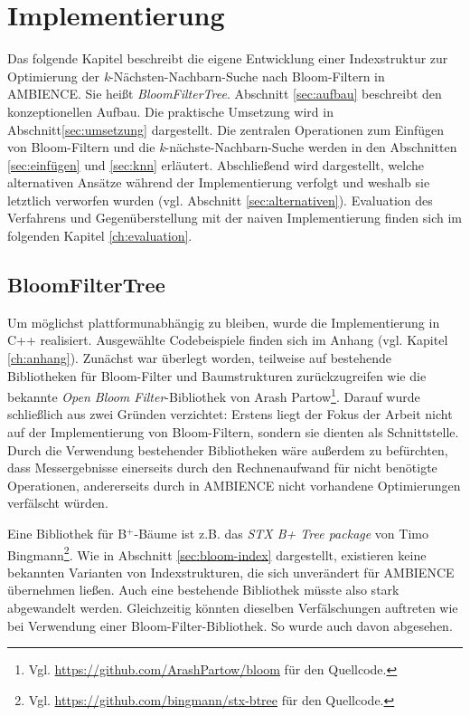 \chapter{Implementierung}\label{ch:implementierung}
Das folgende Kapitel beschreibt die eigene Entwicklung einer Indexstruktur zur Optimierung der \textit{k}-Nächsten-Nachbarn-Suche nach Bloom-Filtern in AMBIENCE. Sie heißt \textit{BloomFilterTree}. Abschnitt \ref{sec:aufbau} beschreibt den konzeptionellen Aufbau. Die praktische Umsetzung wird in Abschnitt\ref{sec:umsetzung} dargestellt. Die zentralen Operationen zum Einfügen von Bloom-Filtern und die \textit{k}-nächste-Nachbarn-Suche werden in den Abschnitten \ref{sec:einfügen} und \ref{sec:knn} erläutert. Abschließend wird dargestellt, welche alternativen Ansätze während der Implementierung verfolgt und weshalb sie letztlich verworfen wurden (vgl. Abschnitt \ref{sec:alternativen}). Evaluation des Verfahrens und Gegenüberstellung mit der naiven Implementierung finden sich im folgenden Kapitel \ref{ch:evaluation}.  
\section{BloomFilterTree}\label{sec:bloom-filter-tree}
Um möglichst plattformunabhängig zu bleiben, wurde die Implementierung in C++ realisiert. Ausgewählte Codebeispiele finden sich im Anhang (vgl. Kapitel \ref{ch:anhang}). Zunächst war überlegt worden, teilweise auf bestehende Bibliotheken für Bloom-Filter und Baumstrukturen zurückzugreifen wie die bekannte \textit{Open Bloom Filter}-Bibliothek von Arash Partow\footnote{Vgl. \url{https://github.com/ArashPartow/bloom} für den Quellcode.}. Darauf wurde schließlich aus zwei Gründen verzichtet: Erstens liegt der Fokus der Arbeit nicht auf der Implementierung von Bloom-Filtern, sondern sie dienten als Schnittstelle. Durch die Verwendung bestehender Bibliotheken wäre außerdem zu befürchten, dass Messergebnisse einerseits durch den Rechnenaufwand für nicht benötigte Operationen, andererseits durch in AMBIENCE nicht vorhandene Optimierungen verfälscht würden. 

Eine Bibliothek für B$^+$-Bäume ist z.B. das \textit{STX B+ Tree package} von Timo Bingmann\footnote{Vgl. \url{https://github.com/bingmann/stx-btree} für den Quellcode.}. Wie in Abschnitt \ref{sec:bloom-index} 
dargestellt, existieren keine bekannten Varianten von Indexstrukturen, die sich unverändert für AMBIENCE übernehmen ließen. Auch eine bestehende Bibliothek müsste also stark abgewandelt werden. Gleichzeitig könnten dieselben Verfälschungen auftreten wie bei Verwendung einer Bloom-Filter-Bibliothek. So wurde auch davon abgesehen.
